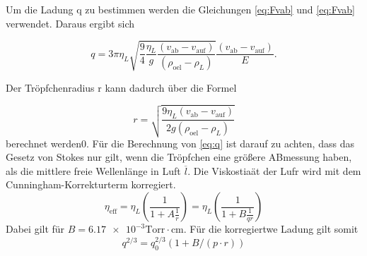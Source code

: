 Um die Ladung q zu bestimmen werden die Gleichungen \ref{eq:Fvab} und \ref{eq:Fvab} verwendet.
Daraus ergibt sich

\begin{equation}
    \label{eq:q}
    q = 
    3 \pi \eta_L \sqrt{\frac{9}{4} \frac{\eta_L}{g} \frac{(v_\text{ab} - v_\text{auf})}{(\rho_\text{oel} - \rho_L)}} \frac{(v_\text{ab} - v_\text{auf})}{E}.
\end{equation}

Der Tröpfchenradius r kann dadurch über die Formel 

\begin{equation}
    \label{eq:r}
    r = \sqrt{\frac{9 \eta_L (v_\text{ab} - v_\text{auf})}{2 g (\rho_\text{oel} - \rho_L)}}
\end{equation}
berechnet werden0.
Für die Berechnung von \ref{eq:q} ist darauf zu achten, dass das Gesetz von Stokes nur gilt, wenn die Tröpfchen eine größere ABmessung haben, als die 
mittlere freie Wellenlänge in Luft $\overline{l}$.
Die Viskostiaät der Lufr wird mit dem Cunningham-Korrekturterm korregiert.
\begin{equation}
    \label{eq:nl}
    \eta_\text{eff} = \eta_L (\frac{1}{1 + A \frac{1}{r}}) =  \eta_L (\frac{1}{1 + B \frac{1}{q r}})
\end{equation}
Dabei gilt für $B = \num{6.17 e-3}\text{Torr} \cdot \text{cm} $. 
Für die korregiertwe Ladung gilt somit
\begin{equation}
    \label{eq:qkor}
    q^{2/3} = q_0^{2/3} (1 + B /(p \cdot r))
\end{equation}
\cite{sample}
